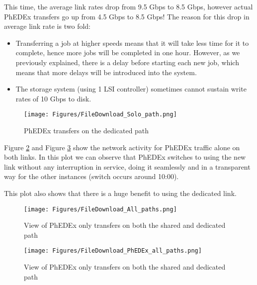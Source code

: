 This time, the average link rates drop from 9.5 Gbps to 8.5 Gbps, however 
actual PhEDEx transfers go up from 4.5 Gbps to 8.5 Gbps! The reason for this 
drop in average link rate is two fold: 

\begin{itemize}
  \item Transferring a job at higher speeds means that it will take less time for
  it to complete, hence more jobs will be completed in one hour. However, as
  we previously explained, there is a delay before starting each new job, which
  means that more delays will be introduced into the system.
  \item The storage system (using 1 LSI controller) sometimes cannot sustain
  write rates of 10 Gbps to disk.
\end{itemize}


\begin{figure}[h]
  \centering
  \texttt{[image: Figures/FileDownload\_Solo\_path.png]}
  \caption{PhEDEx transfers on the dedicated path}
    \label{fig:solo_transfers}
\end{figure} 

Figure \ref{fig:combined_transfers} and Figure \ref{fig:combined_phedex_transfers} show
the  network activity for PhEDEx traffic alone on both links. 
In this plot we can observe that PhEDEx switches to using the
new link without any interruption in service, doing it seamlessly and in a 
transparent way for the other instances (switch occurs around 10:00).

This plot also shows that there is a huge benefit to using the dedicated link.

\begin{figure}[h]
  \centering
  \texttt{[image: Figures/FileDownload\_All\_paths.png]}
  \caption{View of PhEDEx only transfers on both the shared and dedicated path}
  \label{fig:combined_transfers}
\end{figure} 

\begin{figure}[h]
  \centering
  \texttt{[image: Figures/FileDownload\_PhEDEx\_all\_paths.png]}
  \caption{View of PhEDEx only transfers on both the shared and dedicated path}
  \label{fig:combined_phedex_transfers}
\end{figure} 